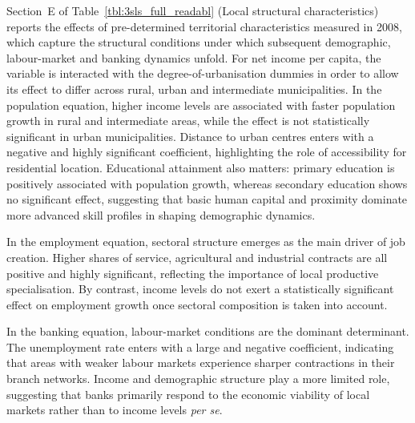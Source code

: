 \documentclass[a4paper,11pt,oneside]{article}
\begin{document}
{Section~E of Table~\ref{tbl:3sls_full_readabl} (Local structural characteristics) reports the effects of pre-determined territorial characteristics measured in 2008, which capture the structural conditions under which subsequent demographic, labour-market and banking dynamics unfold. For net income per capita, the variable is interacted with the degree-of-urbanisation dummies in order to allow its effect to differ across rural, urban and intermediate municipalities. In the population equation, higher income levels are associated with faster population growth in rural and intermediate areas, while the effect is not statistically significant in urban municipalities. Distance to urban centres  enters with a negative and highly significant coefficient, highlighting the role of accessibility for residential location. Educational attainment also matters: primary education is positively associated with population growth, whereas secondary education shows no significant effect, suggesting that basic human capital and proximity dominate more advanced skill profiles in shaping demographic dynamics.


In the employment equation, sectoral structure emerges as the main driver of job creation. Higher shares of service, agricultural and industrial contracts are all positive and highly significant, reflecting the importance of local productive specialisation. By contrast, income levels do not exert a statistically significant effect on employment growth once sectoral composition is taken into account.

In the banking equation, labour-market conditions are the dominant determinant. The unemployment rate enters with a large and negative coefficient, indicating that areas with weaker labour markets experience sharper contractions in their branch networks. Income and demographic structure play a more limited role, suggesting that banks primarily respond to the economic viability of local markets rather than to income levels \textsl{per se}.








}
\end{document}
